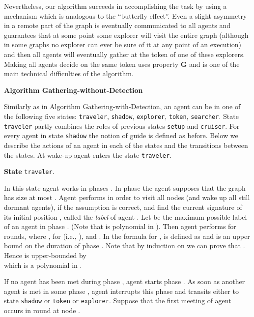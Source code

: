 \documentclass[11pt]{article}
\begin{document}
Nevertheless, our algorithm succeeds in accomplishing the task by using a mechanism which is analogous to the ``butterfly effect''.
Even a slight asymmetry in a remote part of the graph is eventually communicated to all agents and
guarantees that at some point some explorer will visit the entire graph (although in some graphs no explorer can ever be sure of it at any point of an execution) and then all agents will eventually gather at the token of one of these explorers. Making all agents decide on the same token uses property {\bf G}
and is one of the main technical difficulties of the algorithm.

 \vspace*{0.2cm}
 
  \noindent
{\bf Algorithm Gathering-without-Detection}

 Similarly as in Algorithm Gathering-with-Detection,  an agent can be in one of the following five states: {\tt traveler}, {\tt shadow}, {\tt explorer},  {\tt token}, {\tt searcher}.
 State {\tt traveler} partly combines the roles of previous states {\tt setup} and {\tt cruiser}. 
 For every agent  in state  {\tt shadow} the notion of guide is defined as before. 
 Below we describe the actions of an agent  in each of the states and the transitions between the states. At wake-up agent  enters the state  {\tt traveler}.
 
  \vspace*{0.2cm}
 
  \noindent
  {\bf State} {\tt traveler}.
  
  {In this state agent  works in phases  {}. In phase  the agent supposes that the graph has size at most .
 {Agent  performs  in order to visit all nodes (and wake up all still dormant agents), if the assumption is correct, and find the current signature of its initial position , called the {\em label}  of agent .}
 Let  be the maximum possible label of an agent in phase . (Note that  is polynomial in ).
 Then  agent  performs  for  rounds, where {}, for { (i.e., ), and . In the formula for ,  is defined as {} and is an upper bound on the duration of phase . Note that by induction on  we can prove that . Hence  is upper-bounded by\\  which is a polynomial in .}}



 {If no agent has been met during phase , agent  starts phase .} As soon as another agent is met in some phase , agent 
 interrupts this phase and transits either to state
 {\tt shadow} or {\tt token} or {\tt explorer}. Suppose that the first meeting of agent  occurs in round  at node .
 
\end{document}
